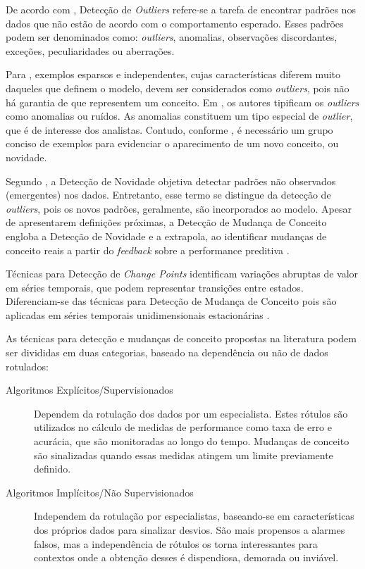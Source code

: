 \documentclass[qual, classic, a4paper]{ufbathesis}
\begin{document}
De acordo com \cite{Chandola:2009:ADS:1541880.1541882}, 
Detecção de \textit{Outliers} refere-se a tarefa de encontrar padrões nos dados que não estão de acordo com o comportamento esperado.
Esses padrões podem ser denominados como: \textit{outliers}, anomalias, observações discordantes, exceções, peculiaridades ou aberrações.

Para \cite{Gama:2010:KDD:1855075}, exemplos esparsos e independentes, cujas características diferem muito daqueles que definem o modelo, 
devem ser considerados como \textit{outliers}, pois não há garantia de que representem um conceito. 
Em \cite{Aggarwal:2003:FCE:1315451.1315460}, os autores tipificam os \textit{outliers} como anomalias ou ruídos.
As anomalias constituem um tipo especial de \textit{outlier}, que é de interesse dos analistas.
Contudo, conforme \cite{Gama:2010:KDD:1855075}, é necessário um grupo conciso de exemplos para evidenciar o aparecimento de um novo conceito, ou novidade.

Segundo \cite{Chandola:2009:ADS:1541880.1541882}, a Detecção de Novidade objetiva detectar padrões não observados (emergentes) nos dados.
Entretanto, esse termo se distingue da detecção de \textit{outliers}, pois os novos padrões, geralmente, são incorporados ao modelo.
Apesar de apresentarem definições próximas, a Detecção de Mudança de Conceito engloba a Detecção de Novidade e a extrapola, ao identificar 
mudanças de conceito reais a partir do \textit{feedback} sobre a performance preditiva \cite{Gama:2010:KDD:1855075}.

Técnicas para Detecção de \textit{Change Points} identificam variações abruptas de valor em séries temporais, que podem representar transições entre estados.
Diferenciam-se das técnicas para Detecção de Mudança de Conceito pois são aplicadas em séries temporais unidimensionais estacionárias \cite{Aminikhanghahi:2017:SMT:3086013.3086037}.

As técnicas para detecção e mudanças de conceito propostas na literatura podem ser divididas em duas categorias, baseado na dependência ou não de dados rotulados:
\begin{description}
    \item[Algoritmos Explícitos/Supervisionados] Dependem da rotulação dos dados por um especialista.
    Estes rótulos são utilizados no cálculo de medidas de performance como taxa de erro e acurácia, que são monitoradas ao longo do tempo.
    Mudanças de conceito são sinalizadas quando essas medidas atingem um limite previamente definido.

    \item[Algoritmos Implícitos/Não Supervisionados] Independem da rotulação por especialistas, 
    baseando-se em características dos próprios dados para sinalizar desvios.
    São mais propensos a alarmes falsos, mas a independência de rótulos os torna interessantes para contextos onde a obtenção desses é dispendiosa, demorada ou inviável.
\end{description}
\end{document}
